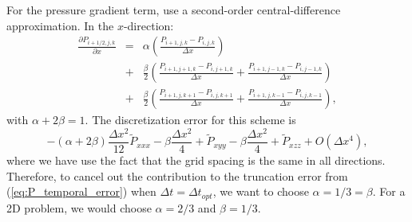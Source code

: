 \documentclass[fleqn,12pt,twoside]{article}
\newcommand{\beq}{\begin{equation}}
\newcommand{\eeq}{\end{equation}}
\newcommand{\bea}{\begin{eqnarray}}
\newcommand{\eea}{\end{eqnarray}}
\def\px{\partial x}
\def\tP{\tilde{P}}
\def\dt{\Delta t}
\def\dx{\Delta x}
\begin{document}
For the pressure gradient term, use a second-order central-difference 
approximation.  In the $x$-direction:
\bea
  \frac{\partial P_{i+1/2,j,k}}{\px} &=& 
  \alpha \left(\frac{P_{i+1,j,k}-P_{i,j,k}}{\dx}\right)
  \nonumber \\
  &+& \frac{\beta}{2} \left( \frac{P_{i+1,j+1,k}-P_{i,j+1,k}}{\dx} 
                           + \frac{P_{i+1,j-1,k}-P_{i,j-1,k}}{\dx} 
                      \right)
  \nonumber \\
  &+& \frac{\beta}{2} \left( \frac{P_{i+1,j,k+1}-P_{i,j,k+1}}{\dx} 
                           + \frac{P_{i+1,j,k-1}-P_{i,j,k-1}}{\dx} 
                      \right),
\eea
with $\alpha + 2 \beta = 1$.
The discretization error for this scheme is 
\beq
  - \left(\alpha + 2 \beta \right ) \frac{\dx^2}{12} \tP_{xxx}
  - \beta \frac{\dx^2}{4} + \tP_{xyy}
  - \beta \frac{\dx^2}{4} + \tP_{xzz}
  + O(\dx^4),
\eeq
where we have use the fact that the grid spacing is the same in all
directions.  Therefore, to cancel out the contribution to the truncation
error from (\ref{eq:P_temporal_error}) when $\dt = \dt_{opt}$, we want to 
choose $\alpha = 1/3 = \beta$.  For a 2D problem, we would choose 
$\alpha = 2/3$ and $\beta = 1/3$.  
\end{document}
